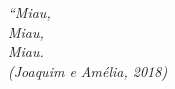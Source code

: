 \begin{epigrafe}
    \vspace*{\fill}
	\begin{flushright}
		\textit{``Miau, \\
		Miau, \\
		Miau. \\
		(Joaquim e Amélia, 2018)}
	\end{flushright}
\end{epigrafe}

